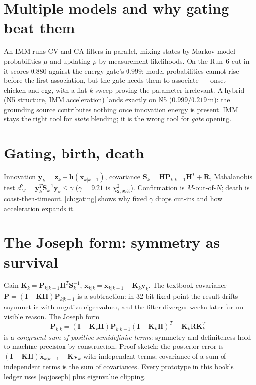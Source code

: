\documentclass[11pt,oneside]{book}
\begin{document}
\section{Multiple models and why gating beat them}
\label{sec:imm}

An IMM runs CV and CA filters in parallel, mixing states by Markov model
probabilities $\mu$ and updating $\mu$ by measurement likelihoods. On the
Run~6 cut-in it scores $0.880$ against the energy gate's $0.999$: model
probabilities cannot rise before the first association, but the gate needs
them to associate --- onset chicken-and-egg, with a flat $k$-sweep proving
the parameter irrelevant. A hybrid (N5 structure, IMM acceleration) lands
exactly on N5 ($0.999/0.219\,\mathrm{m}$): the grounding source contributes
nothing once innovation energy is present. IMM stays the right tool for
\emph{state} blending; it is the wrong tool for \emph{gate} opening.

\section{Gating, birth, death}
\label{sec:gating}

Innovation $\mathbf{y}_k=\mathbf{z}_k-\mathbf{h}(\mathbf{x}_{k|k-1})$,
covariance $\mathbf{S}_k=\mathbf{H}\mathbf{P}_{k|k-1}\mathbf{H}^T+\mathbf{R}$,
Mahalanobis test $d_M^2=\mathbf{y}_k^T\mathbf{S}_k^{-1}\mathbf{y}_k\le\gamma$
($\gamma=9.21$ is $\chi^2_{2,99\%}$). Confirmation is $M$-out-of-$N$; death
is coast-then-timeout. \cref{ch:gating} shows why fixed $\gamma$ drops
cut-ins and how acceleration expands it.

\section{The Joseph form: symmetry as survival}
\label{sec:joseph}

Gain $\mathbf{K}_k=\mathbf{P}_{k|k-1}\mathbf{H}^T\mathbf{S}_k^{-1}$,
$\mathbf{x}_{k|k}=\mathbf{x}_{k|k-1}+\mathbf{K}_k\mathbf{y}_k$. The textbook
covariance $\mathbf{P}=(\mathbf{I}-\mathbf{KH})\mathbf{P}_{k|k-1}$ is a
subtraction: in 32-bit fixed point the result drifts asymmetric with
negative eigenvalues, and the filter diverges weeks later for no visible
reason. The Joseph form
\begin{equation}
\boxed{\mathbf{P}_{k|k}=(\mathbf{I}-\mathbf{K}_k\mathbf{H})\mathbf{P}_{k|k-1}
(\mathbf{I}-\mathbf{K}_k\mathbf{H})^T+\mathbf{K}_k\mathbf{R}\mathbf{K}_k^T}
\label{eq:joseph}
\end{equation}
is a \emph{congruent sum of positive semidefinite terms}: symmetry and
definiteness hold to machine precision by construction. Proof sketch: the
posterior error is $(\mathbf{I}-\mathbf{KH})\tilde{\mathbf{x}}_{k|k-1}
-\mathbf{K}\mathbf{v}_k$ with independent terms; covariance of a sum of
independent terms is the sum of covariances. Every prototype in this book's
ledger uses \cref{eq:joseph} plus eigenvalue clipping.
\end{document}

